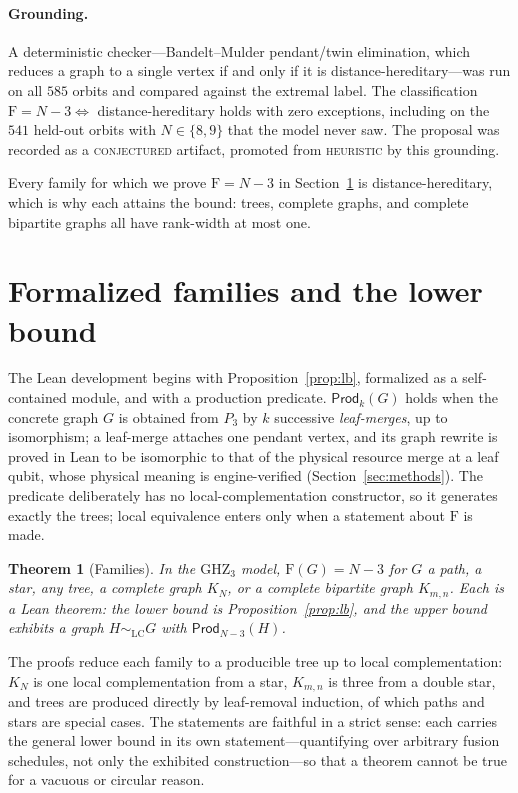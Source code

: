 \documentclass[11pt]{article}
\newtheorem{theorem}{Theorem}
\theoremstyle{definition}
\theoremstyle{remark}
\newcommand{\F}{\mathrm{F}}
\newcommand{\GHZ}{\mathrm{GHZ}_3}
\newcommand{\LC}{\mathrm{LC}}
\newcommand{\Prod}{\mathsf{Prod}}
\newcommand{\N}{N}
\begin{document}
\paragraph{Grounding.} A deterministic checker---Bandelt--Mulder pendant/twin elimination, which
reduces a graph to a single vertex if and only if it is distance-hereditary---was run on all $585$
orbits and compared against the extremal label. The classification $\F=\N-3\Leftrightarrow$
distance-hereditary holds with zero exceptions, including on the $541$ held-out orbits with
$\N\in\{8,9\}$ that the model never saw. The proposal was recorded as a \textsc{conjectured}
artifact, promoted from \textsc{heuristic} by this grounding.

Every family for which we prove $\F=\N-3$ in Section~\ref{sec:families} is distance-hereditary,
which is why each attains the bound: trees, complete graphs, and complete bipartite graphs all
have rank-width at most one.

\section{Formalized families and the lower bound}\label{sec:families}

The Lean development begins with Proposition~\ref{prop:lb}, formalized as a self-contained module,
and with a production predicate. $\Prod_k(G)$ holds when the concrete graph $G$ is obtained from
$P_3$ by $k$ successive \emph{leaf-merges}, up to isomorphism; a leaf-merge attaches one pendant
vertex, and its graph rewrite is proved in Lean to be isomorphic to that of the physical resource
merge at a leaf qubit, whose physical meaning is engine-verified (Section~\ref{sec:methods}). The
predicate deliberately has no local-complementation constructor, so it generates exactly the
trees; local equivalence enters only when a statement about $\F$ is made.

\begin{theorem}[Families]\label{thm:families}
In the $\GHZ$ model, $\F(G)=\N-3$ for $G$ a path, a star, any tree, a complete graph $K_\N$, or a
complete bipartite graph $K_{m,n}$. Each is a Lean theorem: the lower bound is
Proposition~\ref{prop:lb}, and the upper bound exhibits a graph $H\sim_{\LC}G$ with
$\Prod_{\N-3}(H)$.
\end{theorem}

The proofs reduce each family to a producible tree up to local complementation: $K_\N$ is one local
complementation from a star, $K_{m,n}$ is three from a double star, and trees are produced directly
by leaf-removal induction, of which paths and stars are special cases. The statements are faithful
in a strict sense: each carries the general lower bound in its own statement---quantifying over
arbitrary fusion schedules, not only the exhibited construction---so that a theorem cannot be true
for a vacuous or circular reason.
\end{document}
